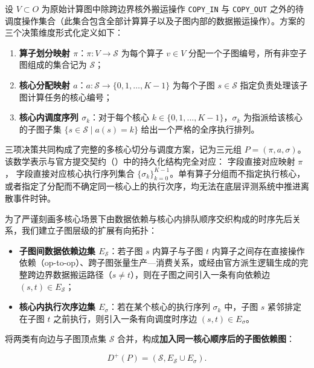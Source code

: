 \documentclass[anonymous,notoc]{gmcm2026}
\providecommand{\tightlist}{\setlength{\itemsep}{0pt}\setlength{\parskip}{0pt}}
\begin{document}
设 \(V \subset O\) 为原始计算图中除跨边界核外搬运操作 \texttt{COPY\_IN} 与 \texttt{COPY\_OUT} 之外的待调度操作集合（此集合包含全部计算算子以及子图内部的数据搬运操作）。方案的三个决策维度形式化定义如下：

\begin{enumerate}
\def\labelenumi{\arabic{enumi}.}
\tightlist
\item
  \textbf{算子划分映射 \(\pi\)}：\(\pi: V \to \mathcal{S}\) 为每个算子 \(v \in V\) 分配一个子图编号，所有非空子图组成的集合记为 \(\mathcal{S}\)；
\item
  \textbf{核心分配映射 \(a\)}：\(a: \mathcal{S} \to \{0, 1, \dots, K-1\}\) 为每个子图 \(s \in \mathcal{S}\) 指定负责处理该子图计算任务的核心编号；
\item
  \textbf{核心内调度序列 \(\sigma_k\)}：对于每个核心 \(k \in \{0, 1, \dots, K-1\}\)，\(\sigma_k\) 为指派给该核心的子图子集 \(\{s \in \mathcal{S} \mid a(s) = k\}\) 给出一个严格的全序执行排列。
\end{enumerate}

三项决策共同构成了完整的多核心切分与调度方案，记为三元组 \(P = (\pi, a, \sigma)\)。该数学表示与官方提交契约（\texttt{}）中的持久化结构完全对应：\texttt{} 字段直接对应映射 \(\pi\)，\texttt{} 字段直接对应核心执行序列集合 \(\{\sigma_k\}_{k=0}^{K-1}\)。单有算子分组而不指定执行核心，或者指定了分配而不确定同一核心上的执行次序，均无法在底层评测系统中推进离散事件时钟。

为了严谨刻画多核心场景下由数据依赖与核心内排队顺序交织构成的时序先后关系，我们建立子图层级的扩展有向拓扑：

\begin{itemize}
\tightlist
\item
  \textbf{子图间数据依赖边集 \(E_{\mathcal{S}}\)}：若子图 \(s\) 内算子与子图 \(t\) 内算子之间存在直接操作依赖（op-to-op）、跨子图张量生产---消费关系，或经由官方派生逻辑生成的完整跨边界数据搬运路径（\(s \ne t\)），则在子图之间引入一条有向依赖边 \((s, t) \in E_{\mathcal{S}}\)；
\item
  \textbf{核心内执行次序边集 \(E_\sigma\)}：若在某个核心的执行序列 \(\sigma_k\) 中，子图 \(s\) 紧邻排定在子图 \(t\) 之前执行，则引入一条有向调度时序边 \((s, t) \in E_\sigma\)。
\end{itemize}

将两类有向边与子图顶点集 \(\mathcal{S}\) 合并，构成\textbf{加入同一核心顺序后的子图依赖图}：

\begin{equation}
D^+(P) = (\mathcal{S}, E_{\mathcal{S}} \cup E_\sigma).
\end{equation}
\end{document}
